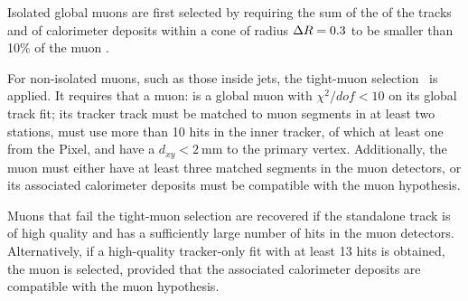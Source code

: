 Isolated global muons are first selected by requiring the
sum of the \pt of the tracks and \ET of calorimeter deposits
within a cone of radius $\Delta R = 0.3$ to be smaller than 10\usep\% of the muon \pt.

For non-isolated muons, such as those inside jets, the tight-muon selection~\cite{CMS-MUO-10-004} is applied.
It requires that a muon:
is a global muon with $\chi^2/dof < 10$ on its global track fit;
its tracker track must be matched to muon segments in at least two stations,
must use more than 10 hits in the inner tracker,
of which at least one from the Pixel,
and have a $d_{xy} < 2~\text{mm}$ to the primary vertex.
Additionally, the muon must either have at least three matched segments in the muon detectors,
or its associated calorimeter deposits must be compatible with the muon hypothesis.

Muons that fail the tight-muon selection are recovered if the standalone track is of high quality
and has a sufficiently large number of hits in the muon detectors.
Alternatively, if a high-quality tracker-only fit with at least 13 hits is obtained,
the muon is selected, provided that the associated calorimeter deposits are compatible with the muon hypothesis.
